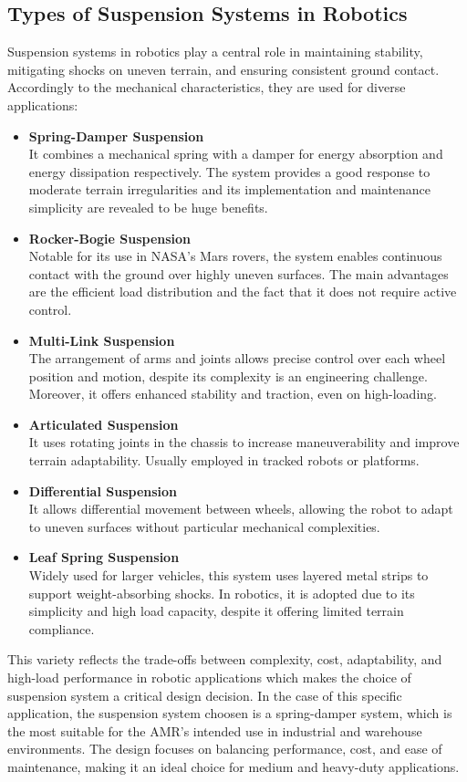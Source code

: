\documentclass[11pt]{article}
\begin{document}
\subsection{Types of Suspension Systems in Robotics}
Suspension systems in robotics play a central role in maintaining stability, mitigating shocks on uneven terrain, and ensuring consistent ground contact. Accordingly to the mechanical characteristics, they are used for diverse applications:
\begin{itemize}
    \item \textbf{Spring-Damper Suspension} \\ It combines a mechanical spring with a damper for energy absorption and energy dissipation respectively. The system provides a good response to moderate terrain irregularities and its implementation and maintenance simplicity are revealed to be huge benefits.
    \item \textbf{Rocker-Bogie Suspension} \\ Notable for its use in NASA’s Mars rovers, the system enables continuous contact with the ground over highly uneven surfaces. The main advantages are the efficient load distribution and the fact that it does not require active control.
    \item \textbf{Multi-Link Suspension} \\ The arrangement of arms and joints allows precise control over each wheel position and motion, despite its complexity is an engineering challenge. Moreover, it offers enhanced stability and traction, even on high-loading. 
    \item \textbf{Articulated Suspension} \\ It uses rotating joints in the chassis to increase maneuverability and improve terrain adaptability. Usually employed in tracked robots or platforms.
    \item \textbf{Differential Suspension} \\ It allows differential movement between wheels, allowing the robot to adapt to uneven surfaces without particular mechanical complexities.
    \item \textbf{Leaf Spring Suspension} \\ Widely used for larger vehicles, this system uses layered metal strips to support weight-absorbing shocks. In robotics, it is adopted due to its simplicity and high load capacity, despite it offering limited terrain compliance.
\end{itemize}
This variety reflects the trade-offs between complexity, cost, adaptability, and high-load performance in robotic applications which makes the choice of suspension system a critical design decision. 
In the case of this specific application, the suspension system choosen is a spring-damper system, which is the most suitable for the AMR's intended use in industrial and warehouse environments. The design focuses on balancing performance, cost, and ease of maintenance, making it an ideal choice for medium and heavy-duty applications.
\end{document}
